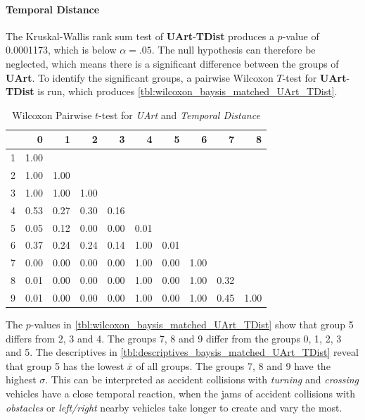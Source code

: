 \paragraph{Temporal Distance}
The Kruskal-Wallis rank sum test of \textbf{UArt}-\textbf{TDist} produces a $p$-value of 0.0001173, which is below $\alpha=.05$. The null hypothesis can therefore be neglected, which means there is a significant difference between the groups of \textbf{UArt}. To identify the significant groups, a pairwise Wilcoxon $T$-test for \textbf{UArt}-\textbf{TDist} is run, which produces \autoref{tbl:wilcoxon_baysis_matched_UArt_TDist}. 
\begin{table}[ht]
	\small
	\centering
	\begin{tabular}{rrrrrrrrrr}
  		\toprule
		& 0 & 1 & 2 & 3 & 4 & 5 & 6 & 7 & 8 \\ 
		\midrule
		1 & 1.00 &  &  &  &  &  &  &  &  \\ 
		2 & 1.00 & 1.00 &  &  &  &  &  &  &  \\ 
		3 & 1.00 & 1.00 & 1.00 &  &  &  &  &  &  \\ 
		4 & 0.53 & 0.27 & 0.30 & 0.16 &  &  &  &  &  \\ 
		5 & 0.05 & 0.12 & 0.00 & 0.00 & 0.01 &  &  &  &  \\ 
		6 & 0.37 & 0.24 & 0.24 & 0.14 & 1.00 & 0.01 &  &  &  \\ 
		7 & 0.00 & 0.00 & 0.00 & 0.00 & 1.00 & 0.00 & 1.00 &  &  \\ 
		8 & 0.01 & 0.00 & 0.00 & 0.00 & 1.00 & 0.00 & 1.00 & 0.32 &  \\ 
		9 & 0.01 & 0.00 & 0.00 & 0.00 & 1.00 & 0.00 & 1.00 & 0.45 & 1.00 \\ 
		\bottomrule
	\end{tabular}
	\caption{Wilcoxon Pairwise $t$-test for \textit{UArt} and \textit{Temporal Distance}}
	\label{tbl:wilcoxon_baysis_matched_UArt_TDist}
\end{table}
The $p$-values in \autoref{tbl:wilcoxon_baysis_matched_UArt_TDist} show that group 5 differs from 2, 3 and 4. The groups 7, 8 and 9 differ from the groups 0, 1, 2, 3 and 5. The descriptives in \autoref{tbl:descriptives_baysis_matched_UArt_TDist} reveal that group 5 has the lowest $\bar{x}$ of all groups. The groups 7, 8 and 9 have the highest $\sigma$. This can be interpreted as accident collisions with \textit{turning} and \textit{crossing} vehicles have a close temporal reaction, when the jams of accident collisions with \textit{obstacles} or \textit{left/right} nearby vehicles take longer to create and vary the most.
